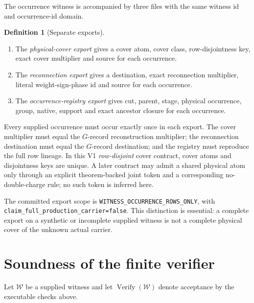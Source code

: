 \documentclass[11pt]{article}
\numberwithin{equation}{section}
\theoremstyle{definition}
\newtheorem{definition}[theorem]{Definition}
\theoremstyle{remark}
\begin{document}
The occurrence witness is accompanied by three files with the same
witness id and occurrence-id domain.

\begin{definition}[Separate exports]
\label{def:exports}
\begin{enumerate}[label=(\alph*),leftmargin=2em]
\item The \emph{physical-cover export} gives a cover atom, cover
  class, row-disjointness key, exact cover multiplier and source for
  each occurrence.
\item The \emph{reconnection export} gives a destination, exact
  reconnection multiplier, literal weight-sign-phase id and source
  for each occurrence.
\item The \emph{occurrence-registry export} gives cut, parent, stage,
  physical occurrence, group, native, support and exact ancestor
  closure for each occurrence.
\end{enumerate}
\end{definition}

Every supplied occurrence must occur exactly once in each export.
The cover multiplier must equal the \(G\)-record reconstruction
multiplier; the reconnection destination must equal the \(G\)-record
destination; and the registry must reproduce the full row lineage.
In this V1 \emph{row-disjoint} cover contract, cover atoms and
disjointness keys are unique.  A later contract may admit a shared
physical atom only through an explicit theorem-backed joint token and
a corresponding no-double-charge rule; no such token is inferred
here.

The committed export scope is
\nolinkurl{WITNESS_OCCURRENCE_ROWS_ONLY}, with
\nolinkurl{claim_full_production_carrier=false}.  This distinction is
essential: a complete export on a synthetic or incomplete supplied
witness is not a complete physical cover of the unknown actual
carrier.

\section{Soundness of the finite verifier}

Let \(\mathcal W\) be a supplied witness and let
\(\operatorname{Verify}(\mathcal W)\) denote acceptance by the
executable checks above.
\end{document}
